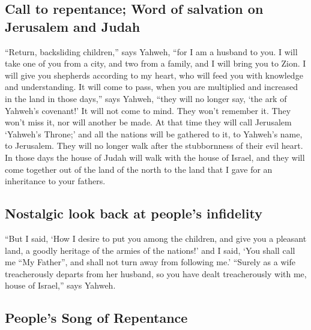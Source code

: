 \hypertarget{call-to-repentance-word-of-salvation-on-jerusalem-and-judah}{%
\subsection{Call to repentance; Word of salvation on Jerusalem and
Judah}\label{call-to-repentance-word-of-salvation-on-jerusalem-and-judah}}

 ``Return, backsliding children,'' says Yahweh, ``for I
am a husband to you. I will take one of you from a city, and two from a
family, and I will bring you to Zion.  I will give you
shepherds according to my heart, who will feed you with knowledge and
understanding.  It will come to pass, when you are
multiplied and increased in the land in those days,'' says Yahweh,
``they will no longer say, `the ark of Yahweh's covenant!' It will not
come to mind. They won't remember it. They won't miss it, nor will
another be made.  At that time they will call Jerusalem
`Yahweh's Throne;' and all the nations will be gathered to it, to
Yahweh's name, to Jerusalem. They will no longer walk after the
stubbornness of their evil heart.  In those days the
house of Judah will walk with the house of Israel, and they will come
together out of the land of the north to the land that I gave for an
inheritance to your fathers.

\hypertarget{nostalgic-look-back-at-peoples-infidelity}{%
\subsection{Nostalgic look back at people's
infidelity}\label{nostalgic-look-back-at-peoples-infidelity}}

 ``But I said, `How I desire to put you among the
children, and give you a pleasant land, a goodly heritage of the armies
of the nations!' and I said, `You shall call me ``My Father'', and shall
not turn away from following me.'  ``Surely as a wife
treacherously departs from her husband, so you have dealt treacherously
with me, house of Israel,'' says Yahweh.

\hypertarget{peoples-song-of-repentance}{%
\subsection{People's Song of
Repentance}\label{peoples-song-of-repentance}}

